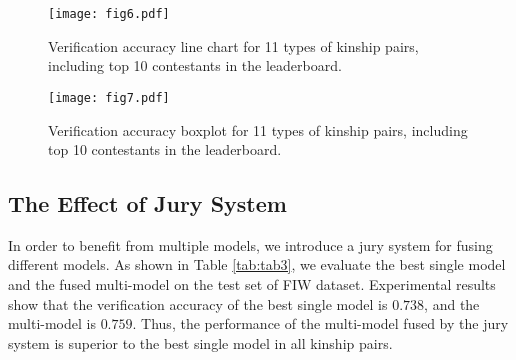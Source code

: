 \documentclass[a4paper, 10pt, conference]{ieeeconf}      %
\begin{document}
\begin{figure}[t]
\setlength{\abovecaptionskip}{0.0cm}
\setlength{\belowcaptionskip}{-0.1cm}
\begin{minipage}[b]{1.0\linewidth}
  \centering
  \centerline{\texttt{[image: fig6.pdf]}}
\end{minipage}
\caption{Verification accuracy line chart for 11 types of kinship pairs, including top 10 contestants in the leaderboard.}
\label{fig:fig6}
\end{figure}


\begin{figure}[t]
\setlength{\abovecaptionskip}{0.0cm}
\setlength{\belowcaptionskip}{-0.0cm}
\begin{minipage}[b]{1.0\linewidth}
  \centering
  \centerline{\texttt{[image: fig7.pdf]}}
\end{minipage}
\caption{Verification accuracy boxplot for 11 types of kinship pairs, including top 10 contestants in the leaderboard.}
\label{fig:fig7}
\end{figure}


\subsection{The Effect of Jury System}

In order to benefit from multiple models, we introduce a jury system for fusing different models. As shown in Table \ref{tab:tab3}, we evaluate the best single model and the fused multi-model on the test set of FIW dataset. Experimental results show that the verification accuracy of the best single model is $0.738$, and the multi-model is $0.759$. Thus, the performance of the multi-model fused by the jury system is superior to the best single model in all kinship pairs. 
\end{document}
